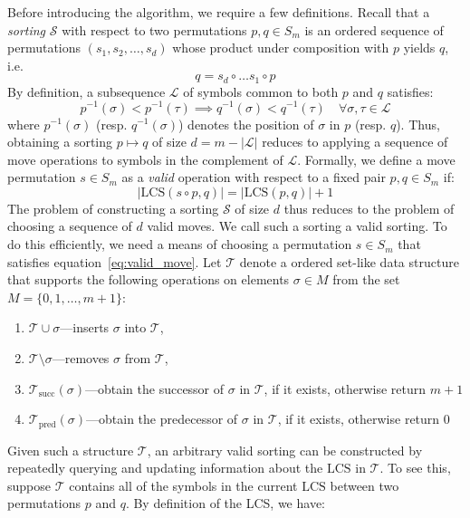 \documentclass{siamart190516}
\begin{document}
 Before introducing the algorithm, we require a few definitions. Recall that a \emph{sorting} $\mathcal{S}$ with respect to two permutations $p, q \in S_m$ is an ordered sequence of permutations $(s_1, s_2, \dots, s_d)$ whose product under composition with $p$ yields $q$, i.e.
 $$ q = s_d \circ \dots s_1 \circ p $$
By definition, a subsequence $\mathcal{L}$ of symbols common to both $p$ and $q$ satisfies:
 $$ p^{-1}(\sigma) < p^{-1}(\tau) \implies q^{-1}(\sigma) < q^{-1}(\tau) \quad \forall \sigma, \tau \in \mathcal{L} $$
 where $p^{-1}(\sigma)$ (resp. $q^{-1}(\sigma)$) denotes the position of $\sigma$ in $p$ (resp. $q$). Thus, obtaining a sorting $p \mapsto q$ of size $d = m - \lvert \mathcal{L} \rvert$ reduces to applying a sequence of move operations to symbols in the complement of $\mathcal{L}$. 
 Formally, we define a move permutation $s \in S_m$ as a \emph{valid} operation with respect to a fixed pair $p, q \in S_m$ if:
 \begin{equation}\label{eq:valid_move}
 	\lvert \mathrm{LCS}(s \circ p, q) \rvert = \lvert \mathrm{LCS}(p,q) \rvert + 1
 \end{equation}
  The problem of constructing a sorting $\mathcal{S}$ of size $d$ thus reduces to the problem of choosing a sequence of $d$ valid moves. We call such a sorting a valid sorting. To do this efficiently, we need a means of choosing a permutation $s \in S_m$ that satisfies equation~\ref{eq:valid_move}. 
  Let $\mathcal{T}$ denote a ordered set-like data structure that supports the following operations on elements $\sigma \in M$ from the set $M = \{0, 1, \dots, m+1\}$:
  \begin{enumerate}
  	\item $\mathcal{T} \cup \sigma$---inserts $\sigma$ into $\mathcal{T}$,
  	\item $\mathcal{T} \setminus \sigma$---removes $\sigma$ from $\mathcal{T}$,
  	\item $\mathcal{T}_{\mathrm{succ}}(\sigma)$---obtain the successor of $\sigma$ in $\mathcal{T}$, if it exists, otherwise return $m+1$
  	\item $\mathcal{T}_{\mathrm{pred}}(\sigma)$---obtain the predecessor of $\sigma$ in $\mathcal{T}$, if it exists, otherwise return $0$
  \end{enumerate}
  Given such a structure $\mathcal{T}$, an arbitrary valid sorting can be constructed by repeatedly querying and updating information about the $\mathrm{LCS}$ in $\mathcal{T}$. To see this, suppose $\mathcal{T}$ contains all of the symbols in the current $\mathrm{LCS}$ between two permutations $p$ and $q$. By definition of the LCS, we have:
\end{document}
